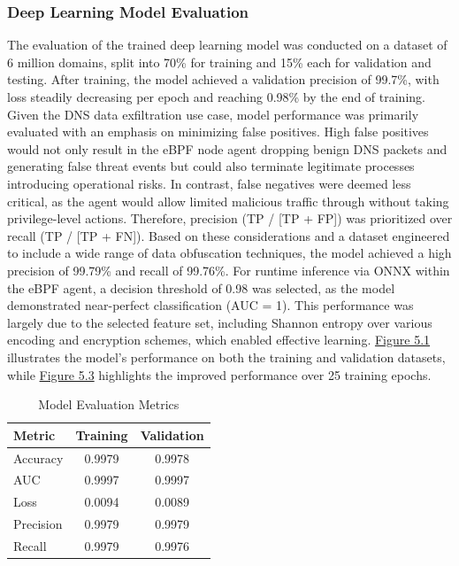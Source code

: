 \documentclass [11pt, proquest] {uwthesis}[2020/02/24]
\begin{document}
\subsubsection{Deep Learning Model Evaluation}
The evaluation of the trained deep learning model was conducted on a dataset of 6 million domains, split into 70\% for training and 15\% each for validation and testing. After training, the model achieved a validation precision of 99.7\%, with loss steadily decreasing per epoch and reaching 0.98\% by the end of training. Given the DNS data exfiltration use case, model performance was primarily evaluated with an emphasis on minimizing false positives. High false positives would not only result in the eBPF node agent dropping benign DNS packets and generating false threat events but could also terminate legitimate  processes introducing operational risks. In contrast, false negatives were deemed less critical, as the agent would allow limited malicious traffic through without taking privilege-level actions. Therefore, precision (TP / [TP + FP]) was prioritized over recall (TP / [TP + FN]). Based on these considerations and a dataset engineered to include a wide range of data obfuscation techniques, the model achieved a high precision of 99.79\% and recall of 99.76\%. For runtime inference via ONNX within the eBPF agent, a decision threshold of 0.98 was selected, as the model demonstrated near-perfect classification (AUC = 1). This performance was largely due to the selected feature set, including Shannon entropy over various encoding and encryption schemes, which enabled effective learning. \hyperref[model_metrics]{Figure 5.1} illustrates the model’s performance on both the training and validation datasets, while \hyperref[fig:model_metrics_quadrant]{Figure 5.3} highlights the improved performance over 25 training epochs.

\begin{table}[H]
\centering
\begin{tabular}{lcc}
\hline
\textbf{Metric} & \textbf{Training} & \textbf{Validation} \\
\hline
Accuracy & 0.9979 & 0.9978 \\
AUC & 0.9997 & 0.9997 \\
Loss & 0.0094 & 0.0089 \\
Precision & 0.9979 & 0.9979 \\
Recall & 0.9979 & 0.9976 \\
\hline
\end{tabular}
\caption{Model Evaluation Metrics}
\label{model-evaluation-metrics}
\end{table}
\end{document}
